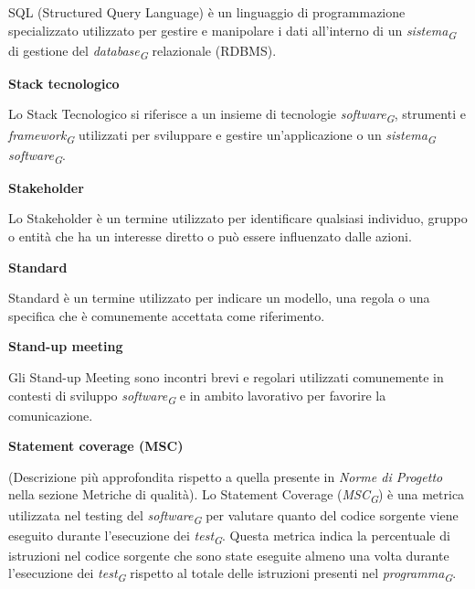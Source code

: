 \documentclass{article}
\begin{document}
SQL (Structured Query Language) è un linguaggio di programmazione specializzato utilizzato per gestire e manipolare i dati all'interno di un \textit{sistema}\textsubscript{\textit{G}} di gestione del \textit{database}\textsubscript{\textit{G}} relazionale (RDBMS).

\vspace{0.4cm}

\textbf{Stack tecnologico}

\vspace{0.1cm}

Lo Stack Tecnologico si riferisce a un insieme di tecnologie \textit{software}\textsubscript{\textit{G}}, strumenti e \textit{framework}\textsubscript{\textit{G}} utilizzati per sviluppare e gestire un'applicazione o un \textit{sistema}\textsubscript{\textit{G}} \textit{software}\textsubscript{\textit{G}}.

\vspace{0.4cm}

\textbf{Stakeholder}

\vspace{0.1cm}

Lo Stakeholder è un termine utilizzato per identificare qualsiasi individuo, gruppo o entità che ha un interesse diretto o può essere influenzato dalle azioni.

\vspace{0.4cm}

\textbf{Standard}

\vspace{0.1cm}

Standard è un termine utilizzato per indicare un modello, una regola o una specifica che è comunemente accettata come riferimento.

\vspace{0.4cm}

\textbf{Stand-up meeting}

\vspace{0.1cm}

Gli Stand-up Meeting sono incontri brevi e regolari utilizzati comunemente in contesti di sviluppo \textit{software}\textsubscript{\textit{G}} e in ambito lavorativo per favorire la comunicazione.

\vspace{0.4cm}

\textbf{Statement coverage (MSC)}

\vspace{0.1cm}

(Descrizione più approfondita rispetto a quella presente in \textit{Norme di Progetto} nella sezione Metriche di qualità). Lo Statement Coverage (\textit{MSC}\textsubscript{\textit{G}}) è una metrica utilizzata nel testing del \textit{software}\textsubscript{\textit{G}} per valutare quanto del codice sorgente viene eseguito durante l'esecuzione dei \textit{test}\textsubscript{\textit{G}}.
Questa metrica indica la percentuale di istruzioni nel codice sorgente che sono state eseguite almeno una volta durante l'esecuzione dei \textit{test}\textsubscript{\textit{G}} rispetto al totale delle istruzioni presenti nel \textit{programma}\textsubscript{\textit{G}}. 
\end{document}
